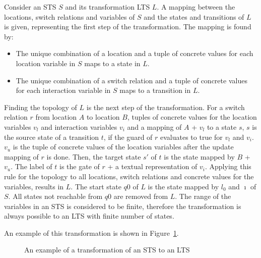 Consider an STS $S$ and its transformation LTS $L$. A mapping between the locations, switch relations and variables of $S$ and the states and transitions of $L$ is given, representing the first step of the transformation. The mapping is found by:
\begin{itemize}
  \item The unique combination of a location and a tuple of concrete values for each location variable in $S$ maps to a state in $L$. 
  \item The unique combination of a switch relation and a tuple of concrete values for each interaction variable in $S$ maps to a transition in $L$.
\end{itemize}
Finding the topology of $L$ is the next step of the transformation. For a switch relation $r$ from location $A$ to location $B$, tuples of concrete values for the location variables $v_l$ and interaction variables $v_i$ and a mapping of $A$ + $v_l$ to a state $s$, $s$ is the source state of a transition $t$, if the guard of $r$ evaluates to true for $v_l$ and $v_i$. $v_u$ is the tuple of concrete values of the location variables after the update mapping of $r$ is done. Then, the target state $s'$ of $t$ is the state mapped by $B$ + $v_u$. The label of $t$ is the gate of $r$ + a textual representation of $v_i$. Applying this rule for the topology to all locations, switch relations and concrete values for the variables, results in $L$. The start state $q0$ of $L$ is the state mapped by $l_0$ and $\imath$ of $S$. All states not reachable from $q0$ are removed from $L$. The range of the variables in an STS is considered to be finite, therefore the transformation is always possible to an LTS with finite number of states.

An example of this transformation is shown in Figure~\ref{fig:example_trafo}. 

\begin{figure}[h]
  \begin{center}
    \hspace{20px}
  \end{center}
  \caption{An example of a transformation of an STS to an LTS}
  \label{fig:example_trafo}
\end{figure}

